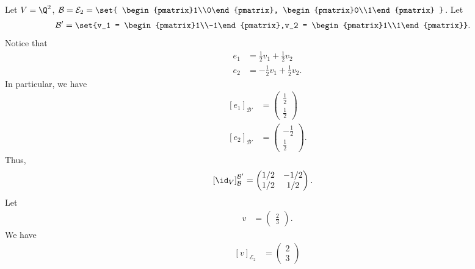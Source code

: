 \documentclass[10pt]{mypackage}
\begin{document}
\begin{example}
  Let $V = \Q^2$, $\mathcal{B} = \mathcal{E}_2 = \set{ \begin{pmatrix}1\\0\end{pmatrix}, \begin{pmatrix}0\\1\end{pmatrix} }$. Let
  \begin{align*}
    \mathcal{B}' &= \set{v_1 = \begin{pmatrix}1\\-1\end{pmatrix},v_2 = \begin{pmatrix}1\\1\end{pmatrix}}.
  \end{align*}
  Notice that
  \begin{align*}
    e_1 &= \frac{1}{2}v_1 + \frac{1}{2}v_2\\
    e_2 &= -\frac{1}{2}v_1 + \frac{1}{2}v_2.
  \end{align*}
  In particular, we have
  \begin{align*}
    \left[e_1\right]_{\mathcal{B}'} &= \begin{pmatrix}\frac{1}{2}\\\frac{1}{2}\end{pmatrix}\\
    \left[e_2\right]_{\mathcal{B}'} &= \begin{pmatrix}-\frac{1}{2}\\\frac{1}{2}\end{pmatrix}.
  \end{align*}
  Thus,
  \begin{align*}
    \left[\id_{V}\right]_{\mathcal{B}}^{\mathcal{B}'} &= \begin{pmatrix}1/2 & -1/2 \\ 1/2 & 1/2\end{pmatrix}.
  \end{align*}
  Let
  \begin{align*}
    v &= \begin{pmatrix}\frac{2}{3}\end{pmatrix}.
  \end{align*}
  We have
  \begin{align*}
    \left[v\right]_{\mathcal{E}_2} &= \begin{pmatrix}2\\3\end{pmatrix}\\

\end{align*}
\end{example}
\end{document}
